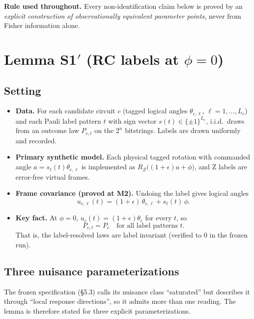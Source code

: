 \documentclass[11pt,a4paper]{article}
\theoremstyle{plain}
\theoremstyle{definition}
\theoremstyle{remark}
\newcommand{\eps}{\epsilon}
\begin{document}
\textbf{Rule used throughout.} Every non-identification claim below is proved by an
\emph{explicit construction of observationally equivalent parameter points}, never from
Fisher information alone.

\section{\texorpdfstring{Lemma S1$'$ (RC labels at $\phi=0$)}{Lemma S1' (RC labels at phi=0)}}

\subsection{Setting}

\begin{itemize}[leftmargin=*,itemsep=2pt]
\item \textbf{Data.} For each candidate circuit $c$ (tagged logical angles $\theta_{c,\ell}$, $\ell=1,\dots,L_c$)
and each Pauli label pattern $t$ with sign vector $s(t)\in\{\pm1\}^{L_c}$, i.i.d.\ draws from an outcome
law $P_{c,t}$ on the $2^n$ bitstrings. Labels are drawn uniformly and recorded.
\item \textbf{Primary synthetic model.} Each physical tagged rotation with commanded angle
$a=s_\ell(t)\theta_{c,\ell}$ is implemented as $R_Z\big((1+\eps)a+\phi\big)$, and Z labels are
error-free virtual frames.
\item \textbf{Frame covariance (proved at M2).} Undoing the label gives logical angles
\[
u_{c,\ell}(t) = (1+\eps)\,\theta_{c,\ell} + s_\ell(t)\,\phi .
\]
\item \textbf{Key fact.} At $\phi=0$, $u_c(t)=(1+\eps)\theta_c$ for every $t$, so
\[
P_{c,t}=P_c\quad\text{for all label patterns } t.
\]
That is, the label-resolved laws are label invariant (verified to $0$ in the frozen run).
\end{itemize}

\subsection{Three nuisance parameterizations}

The frozen specification (\S5.3) calls its nuisance class ``saturated'' but describes it through
``local response directions'', so it admits more than one reading. The lemma is therefore stated
for three explicit parameterizations.
\end{document}
